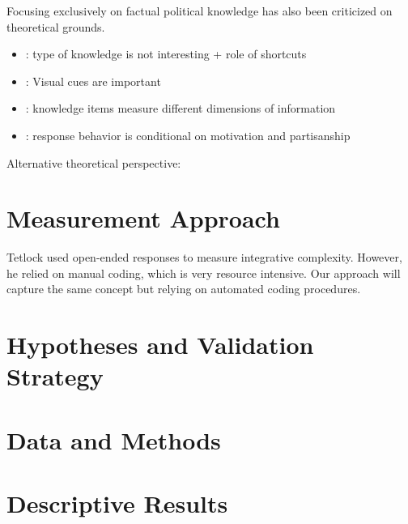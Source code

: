 \documentclass[12pt]{article}
\begin{document}
Focusing exclusively on factual political knowledge has also been criticized on theoretical grounds. 

\begin{itemize}
\item \citep{lupia2006elitism}: type of knowledge is not interesting + role of shortcuts \citet{lupia1994shortcuts}
\item \citep{prior2014visual}: Visual cues are important
\item \citep{barabas2014question}: knowledge items measure different dimensions of information
\item \citep{prior2008money,bullock2015partisan,prior2015you}: response behavior is conditional on motivation and partisanship
\end{itemize}


Alternative theoretical perspective: \citep{tetlock1983cognitive,luskin1987measuring,feldman1988structure,gerring1997ideology}




\section{Measurement Approach}


Tetlock used open-ended responses to measure integrative complexity. However, he relied on manual coding, which is very resource intensive. Our approach will capture the same concept but relying on automated coding procedures.



\section{Hypotheses and Validation Strategy}


\section{Data and Methods}

\section{Descriptive Results}
\end{document}
